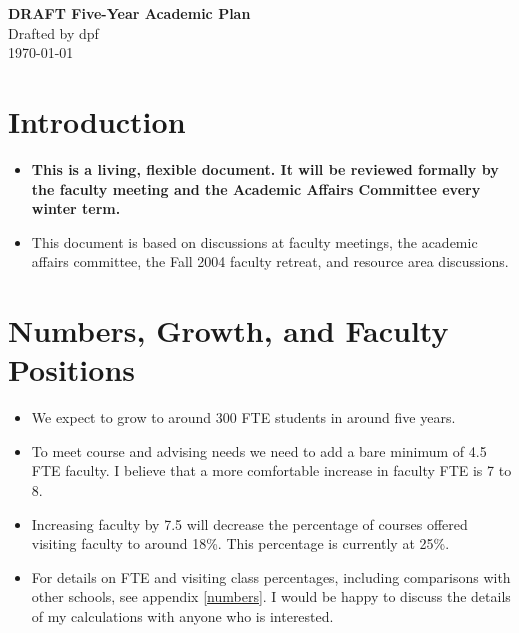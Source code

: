 \documentclass[12pt]{article}
\begin{document}
\pagestyle{empty}
 
\begin{center}
{\Large {\bf DRAFT Five-Year Academic Plan}} \\
\medskip
Drafted by dpf\\
\medskip
\today
\end{center}

\section{Introduction}

\begin{itemize}

\item {\bf This is a living, flexible document.  It will be
reviewed formally by the faculty meeting and the Academic Affairs
Committee every winter term.} 

\item This document is based on discussions at faculty meetings, the
academic affairs committee, the Fall 2004 faculty retreat, and resource
area discussions. 

\end{itemize}


\section{Numbers, Growth, and Faculty Positions}

\begin{itemize}

\item We expect to grow to around 300 FTE students in around five
years. 

\item  To meet course and advising needs we need to add a bare
minimum of 4.5 FTE faculty.  I believe that a more comfortable
increase in faculty FTE is 7 to 8.   

\item Increasing faculty by 7.5 will decrease the percentage of
courses offered visiting faculty to around 18\%.  This percentage is
currently at 25\%. 

\item For details on FTE and visiting class percentages, including
comparisons with other schools, see appendix \ref{numbers}.  I would
be happy to discuss the details of my calculations with anyone who is
interested. 

\end{itemize}
\end{document}

